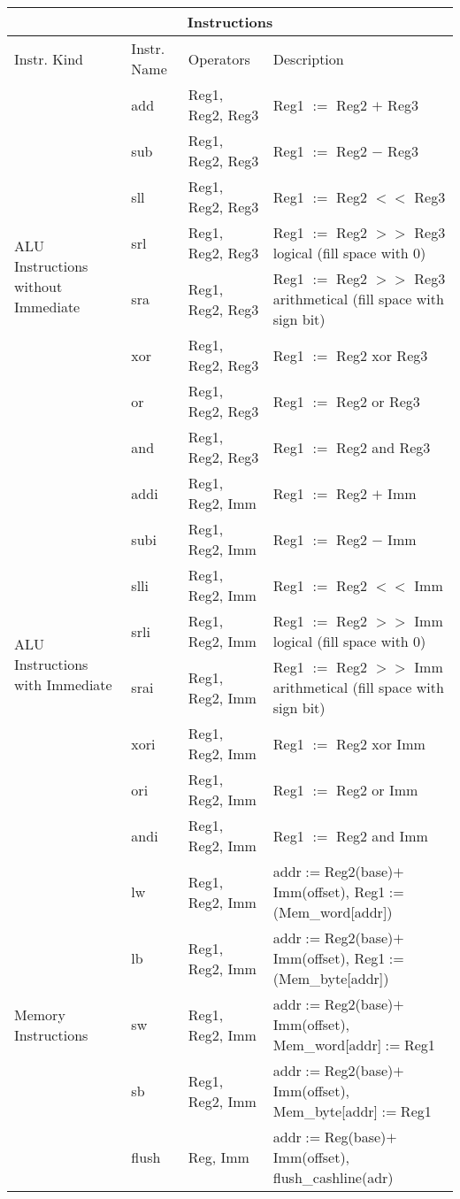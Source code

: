 \documentclass{article}
\begin{document}
{
\centering
\begin{tabular}{ |p{2cm}||p{2cm}|p{3cm}|p{5cm}|  }
 \hline
 \multicolumn{4}{|c|}{Instructions} \\
 \hline %
 Instr. Kind&Instr. Name&Operators&Description\\
 \hline
\multirow{8}{2cm}{ALU Instructions without Immediate} & add &Reg1, Reg2, Reg3&   Reg1 $:=$ Reg2 $+$ Reg3\\
&sub& Reg1, Reg2, Reg3   & Reg1 $:=$ Reg2 $-$ Reg3\\
&sll& Reg1, Reg2, Reg3&  Reg1 $:=$ Reg2 $<<$ Reg3\\
&srl& Reg1, Reg2, Reg3&  Reg1 $:=$ Reg2 $>>$ Reg3 logical (fill space with 0)\\
&sra  & Reg1, Reg2, Reg3& Reg1 $:=$ Reg2 $>>$ Reg3 arithmetical (fill space with sign bit)\\
&xor& Reg1, Reg2, Reg3 &  Reg1 $:=$ Reg2 xor Reg3\\
&or& Reg1, Reg2, Reg3&  Reg1 $:=$ Reg2 or Reg3\\
&and& Reg1, Reg2, Reg3&  Reg1 $:=$ Reg2 and Reg3\\
 \hline
 \multirow{8}{2cm}{ALU Instructions with Immediate} & addi &Reg1, Reg2, Imm&  Reg1 $:=$ Reg2 $+$ Imm\\
&subi& Reg1, Reg2, Imm   & Reg1 $:=$ Reg2 $-$ Imm\\
&slli& Reg1, Reg2, Imm&  Reg1 $:=$ Reg2 $<<$ Imm\\
&srli& Reg1, Reg2, Imm&  Reg1 $:=$ Reg2 $>>$ Imm logical (fill space with 0)\\
&srai  & Reg1, Reg2, Imm&Reg1 $:=$ Reg2 $>>$ Imm arithmetical (fill space with sign bit)\\
&xori& Reg1, Reg2, Imm&Reg1 $:=$ Reg2 xor Imm\\
&ori& Reg1, Reg2, Imm&Reg1 $:=$ Reg2 or Imm\\
&andi& Reg1, Reg2, Imm&Reg1 $:=$ Reg2 and Imm\\
 \hline
  \multirow{5}{2cm}{Memory Instructions} & lw &Reg1, Reg2, Imm&addr$:=$Reg2(base)$+$Imm(offset), Reg1$:=$(Mem\_word[addr])\\
&lb& Reg1, Reg2, Imm   &addr$:=$Reg2(base)$+$Imm(offset), Reg1$:=$(Mem\_byte[addr])\\
&sw& Reg1, Reg2, Imm  &addr$:=$Reg2(base)$+$Imm(offset), Mem\_word[addr]$:=$Reg1\\
&sb& Reg1, Reg2, Imm  &addr$:=$Reg2(base)$+$Imm(offset), Mem\_byte[addr]$:=$Reg1\\
&flush  & Reg, Imm&addr$:=$Reg(base)$+$Imm(offset), flush\_cashline(adr)\\

\end{tabular}}
\end{document}
